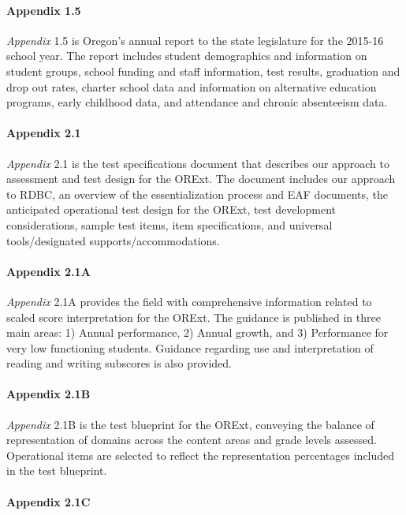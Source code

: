 \documentclass[]{article}
\let\oldparagraph\paragraph
\renewcommand{\paragraph}[1]{\oldparagraph{#1}\mbox{}}
\begin{document}
\paragraph{Appendix 1.5}\label{appendix-1.5}

\emph{Appendix} 1.5 is Oregon's annual report to the state legislature
for the 2015-16 school year. The report includes student demographics
and information on student groups, school funding and staff information,
test results, graduation and drop out rates, charter school data and
information on alternative education programs, early childhood data, and
attendance and chronic absenteeism data.

\paragraph{Appendix 2.1}\label{appendix-2.1}

\emph{Appendix} 2.1 is the test specifications document that describes
our approach to assessment and test design for the ORExt. The document
includes our approach to RDBC, an overview of the essentialization
process and EAF documents, the anticipated operational test design for
the ORExt, test development considerations, sample test items, item
specifications, and universal tools/designated supports/accommodations.

\paragraph{Appendix 2.1A}\label{appendix-2.1a}

\emph{Appendix} 2.1A provides the field with comprehensive information
related to scaled score interpretation for the ORExt. The guidance is
published in three main areas: 1) Annual performance, 2) Annual growth,
and 3) Performance for very low functioning students. Guidance regarding
use and interpretation of reading and writing subscores is also
provided.

\paragraph{Appendix 2.1B}\label{appendix-2.1b}

\emph{Appendix} 2.1B is the test blueprint for the ORExt, conveying the
balance of representation of domains across the content areas and grade
levels assessed. Operational items are selected to reflect the
representation percentages included in the test blueprint.

\paragraph{Appendix 2.1C}\label{appendix-2.1c}
\end{document}
